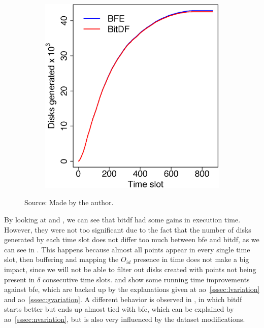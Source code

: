 {\begin{figure}[h!]
\begin{subfigure}[t]{0.48\textwidth}
        \includegraphics[width=\textwidth]{images/Trucks_d.eps}
        \label{fig:trucks_disks}
    \end{subfigure}
    \footnotesize{Source: Made by the author.}
    \label{fig:trucks_results2}
\end{figure}

By looking at  and , we can see that \ac{bitdf} had some gains in
execution time. However, they were not too significant due to the fact that the number of disks generated by each time
slot does not differ too much between \ac{bfe} and \ac{bitdf}, as we can see in . This happens
because almost all points appear in every single time slot, then buffering and mapping the $O_{id}$ presence in time
does not make a big impact, since we will not be able to filter out disks created with points not being present in
$\delta$ consecutive time slots.  and  show some running time
improvements against \ac{bfe}, which are backed up by the explanations given at \ac{ao}~\ref{sssec:lvariation} and
\ac{ao}~\ref{sssec:gvariation}. A different behavior is observed in , in which \ac{bitdf}
starts better but ends up almost tied with \ac{bfe}, which can be explained by \ac{ao}~\ref{sssec:nvariation}, but is
also very influenced by the dataset modifications.
\vfill

}

